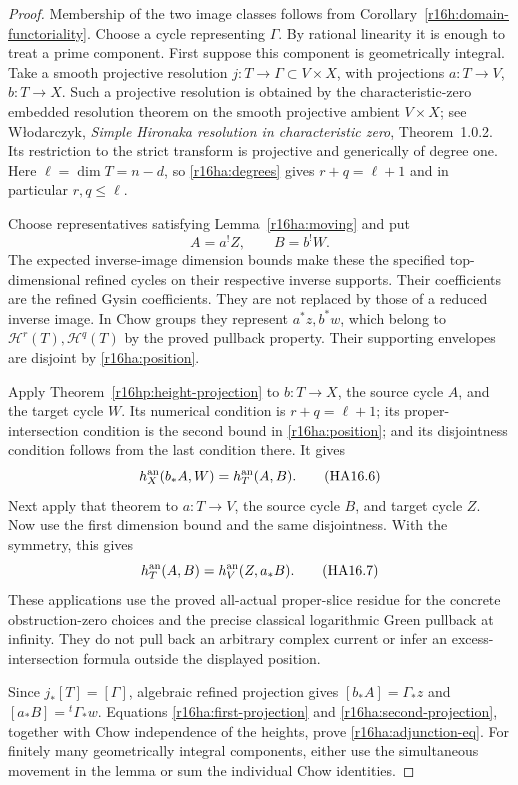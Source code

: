 \documentclass[11pt,a4paper]{article}
\theoremstyle{definition}
\theoremstyle{remark}
\numberwithin{equation}{section}
\begin{document}
\begin{proof}
Membership of the two image classes follows from
Corollary~\ref{r16h:domain-functoriality}. Choose a cycle representing
$\Gamma$. By rational linearity it is enough to treat a prime
component. First suppose this component is geometrically integral.
Take a smooth projective resolution
$j:T\to\Gamma\subset V\times X$, with projections
$a:T\to V$, $b:T\to X$. Such a projective resolution is obtained
by the characteristic-zero embedded resolution theorem on the
smooth projective ambient $V\times X$; see W\l odarczyk,
\emph{Simple Hironaka resolution in characteristic zero},
Theorem~1.0.2. Its restriction to the strict transform is
projective and generically of degree one. Here
$\ell=\dim T=n-d$, so \eqref{r16ha:degrees} gives
$r+q=\ell+1$ and in particular $r,q\leq\ell$.

Choose representatives satisfying Lemma~\ref{r16ha:moving} and put
\[
                 A=a^!Z,\qquad B=b^!W.
 \tag{HA16.5}\label{r16ha:refined-cycles}
\]
The expected inverse-image dimension bounds make these the
specified top-dimensional refined cycles on their respective
inverse supports. Their coefficients are the refined Gysin
coefficients. They are not replaced by those of a reduced
inverse image. In Chow groups they represent $a^*z,b^*w$,
which belong to $\mathcal H^r(T),\mathcal H^q(T)$ by the
proved pullback property. Their supporting envelopes are
disjoint by \eqref{r16ha:position}.

Apply Theorem~\ref{r16hp:height-projection} to $b:T\to X$,
the source cycle $A$, and the target cycle $W$. Its numerical
condition is $r+q=\ell+1$; its proper-intersection condition
is the second bound in \eqref{r16ha:position}; and its disjointness
condition follows from the last condition there. It gives
\[
                  h_X^{\rm an}(b_*A,W)=h_T^{\rm an}(A,B).
 \tag{HA16.6}\label{r16ha:first-projection}
\]
Next apply that theorem to $a:T\to V$, the source cycle $B$,
and target cycle $Z$. Now use the first dimension bound and
the same disjointness. With the symmetry, this gives
\[
                  h_T^{\rm an}(A,B)=h_V^{\rm an}(Z,a_*B).
 \tag{HA16.7}\label{r16ha:second-projection}
\]
These applications use the proved all-actual proper-slice
residue for the concrete obstruction-zero choices and the
precise classical logarithmic Green pullback at infinity.
They do not pull back an arbitrary complex current or infer
an excess-intersection formula outside the displayed position.

Since $j_*[T]=[\Gamma]$, algebraic refined projection gives
$[b_*A]=\Gamma_*z$ and $[a_*B]={}^t\Gamma_*w$.
Equations \eqref{r16ha:first-projection} and
\eqref{r16ha:second-projection}, together with Chow independence
of the heights, prove \eqref{r16ha:adjunction-eq}.
For finitely many geometrically integral components, either use
the simultaneous movement in the lemma or sum the individual
Chow identities.


\end{proof}
\end{document}
